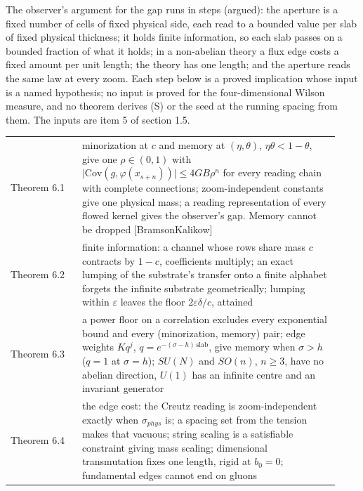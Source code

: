 \documentclass[10pt,letterpaper,twocolumn]{article}
\providecommand{\rm}{}\DeclareOldFontCommand{\rm}{\normalfont\rmfamily}{\mathrm}
\begin{document}
The observer's argument for the gap runs in steps (argued): the aperture is a fixed number of cells of fixed physical side, each read to a bounded value per slab of fixed physical thickness; it holds finite information, so each slab passes on a bounded fraction of what it holds; in a non-abelian theory a flux edge costs a fixed amount per unit length; the theory has one length; and the aperture reads the same law at every zoom. Each step below is a proved implication whose input is a named hypothesis; no input is proved for the four-dimensional Wilson measure, and no theorem derives (S) or the seed at the running spacing from them. The inputs are item 5 of section 1.5.

\begin{center}
{\footnotesize
{}
\tabletail{\midrule}
\tablelasttail{\bottomrule}
\begin{xtabular}{L{0.207\linewidth}L{0.724\linewidth}}
Theorem 6.1 & minorization at \(c\) and memory at \((\eta,\theta)\),
\(\eta\theta<1-\theta\), give one \(\rho\in(0,1)\) with
\(\lvert\mathrm{Cov}(g,\varphi(x_{s+n}))\rvert\le4GB\rho^n\) for every
reading chain with complete connections; zoom-independent constants give
one physical mass; a reading representation of every flowed kernel gives
the observer's gap. Memory cannot be dropped {[}BramsonKalikow{]} \\
Theorem 6.2 & finite information: a channel whose rows share mass \(c\) contracts by
\(1-c\), coefficients multiply; an exact lumping of the substrate's
transfer onto a finite alphabet forgets the infinite substrate
geometrically; lumping within \(\varepsilon\) leaves the floor
\(2\varepsilon\delta/c\), attained \\
Theorem 6.3 & a power floor on a correlation excludes every exponential bound and
every (minorization, memory) pair; edge weights \(Kq^j\),
\(q=e^{-(\sigma-h)\,\mathrm{slab}}\), give memory when \(\sigma>h\)
(\(q=1\) at \(\sigma=h\)); \(SU(N)\) and \(SO(n)\), \(n\ge3\), have no
abelian direction, \(U(1)\) has an infinite centre and an invariant
generator \\
Theorem 6.4 & the edge cost: the Creutz reading is zoom-independent exactly when
\(\sigma_{\rm phys}\) is; a spacing set from the tension makes that
vacuous; string scaling is a satisfiable constraint giving mass scaling;
dimensional transmutation fixes one length, rigid at \(b_0=0\);
fundamental edges cannot end on gluons \\

\end{xtabular}}
\end{center}
\end{document}
